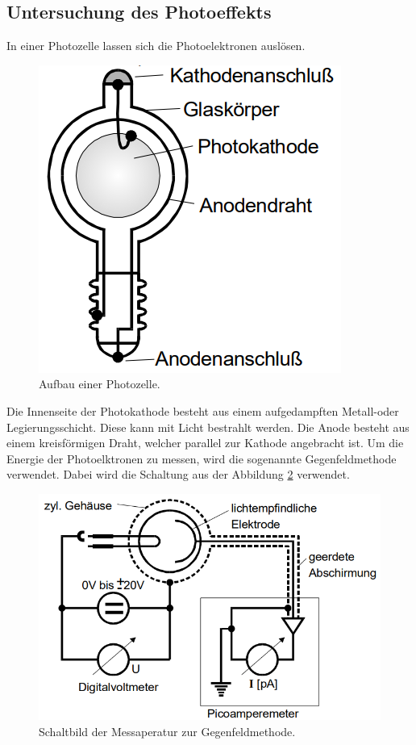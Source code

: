 \subsection{Untersuchung des Photoeffekts}
In einer Photozelle lassen sich die Photoelektronen auslösen.
\begin{figure}
    \centering
    \includegraphics[scale=0.5]{content/Photozelle.png}
    \caption{Aufbau einer Photozelle.\cite{sample}}
    \label{fig:zelle}
\end{figure}
Die Innenseite der Photokathode besteht aus einem aufgedampften Metall-oder Legierungsschicht.
Diese kann mit Licht bestrahlt werden.
Die Anode besteht aus einem kreisförmigen Draht, welcher parallel zur Kathode angebracht ist.
Um die Energie der Photoelktronen zu messen, wird die sogenannte Gegenfeldmethode verwendet.
Dabei wird die Schaltung aus der Abbildung \ref{fig:gegenf} verwendet.
\begin{figure}
    \centering
    \includegraphics[scale=0.5]{content/Gegenfeld.png}
    \caption{Schaltbild der Messaperatur zur Gegenfeldmethode.\cite{sample}}
    \label{fig:gegenf}
\end{figure}

